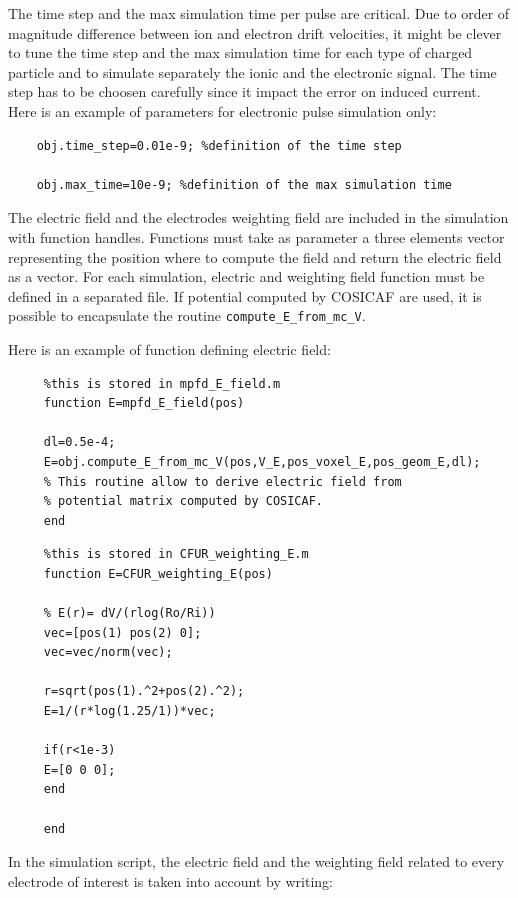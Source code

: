 \documentclass[10pt]{article}
\begin{document}
	The time step and the max simulation time per pulse are critical. Due to order of magnitude difference between ion and electron drift velocities, it might be clever to tune the time step and the max simulation time for each type of charged particle and to simulate separately the ionic and the electronic signal. The time step has to be choosen carefully since it impact the error on induced current. Here is an example of parameters for electronic pulse simulation only:
	
	\begin{lstlisting}
	obj.time_step=0.01e-9; %definition of the time step
	
	obj.max_time=10e-9; %definition of the max simulation time
	\end{lstlisting}
	
	The electric field and the electrodes weighting field are included
	 in the simulation with function handles. Functions must take as parameter a three elements vector representing the position where to compute the field and return the electric field as a vector.
	 For each simulation, electric and weighting field function must be defined in a separated file. If potential computed by COSICAF are used, it is possible to encapsulate the routine \lstinline{compute_E_from_mc_V}.
	 
	 Here is an example of function defining electric field:
	 
	 \begin{lstlisting}
	 %this is stored in mpfd_E_field.m
	 function E=mpfd_E_field(pos)
	 
	 dl=0.5e-4;
	 E=obj.compute_E_from_mc_V(pos,V_E,pos_voxel_E,pos_geom_E,dl);
	 % This routine allow to derive electric field from 
	 % potential matrix computed by COSICAF.
	 end
	 \end{lstlisting}
	 
	 \begin{lstlisting}
	 %this is stored in CFUR_weighting_E.m
	 function E=CFUR_weighting_E(pos)
	 
	 % E(r)= dV/(rlog(Ro/Ri))
	 vec=[pos(1) pos(2) 0];
	 vec=vec/norm(vec);
	
	 r=sqrt(pos(1).^2+pos(2).^2); 
	 E=1/(r*log(1.25/1))*vec;
	 
	 if(r<1e-3)
	 E=[0 0 0];
	 end
	 
	 end
	 \end{lstlisting}
	 
	 In the simulation script, the electric field and the weighting field related to every electrode of interest is taken into account by writing:
	 
\end{document}
